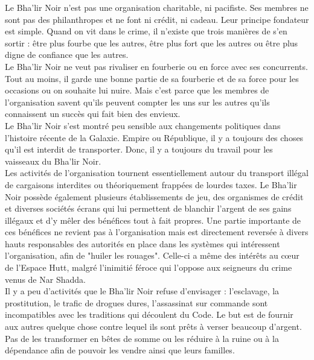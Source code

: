 \documentclass[twoside]{article}
\begin{document}
Le Bha'lir Noir n'est pas une organisation charitable, ni pacifiste. Ses membres ne sont pas des philanthropes et ne font ni crédit, ni cadeau. Leur principe fondateur est simple. Quand on vit dans le crime, il n'existe que trois manières de s'en sortir : être plus fourbe que les autres, être plus fort que les autres ou être plus digne de confiance que les autres.\\

Le Bha'lir Noir ne veut pas rivaliser en fourberie ou en force avec ses concurrents. Tout au moins, il garde une bonne partie de sa fourberie et de sa force pour les occasions ou on souhaite lui nuire. Mais c'est parce que les membres de l'organisation savent qu'ils peuvent compter les uns sur les autres qu'ils connaissent un succès qui fait bien des envieux.\\

Le Bha'lir Noir s'est montré peu sensible aux changements politiques dans l'histoire récente de la Galaxie. Empire ou République, il y a toujours des choses qu'il est interdit de transporter. Donc, il y a toujours du travail pour les vaisseaux du Bha'lir Noir.\\

Les activités de l'organisation tournent essentiellement autour du transport illégal de cargaisons interdites ou théoriquement frappées de lourdes taxes. Le Bha'lir Noir possède également plusieurs établissements de jeu, des organismes de crédit et diverses sociétés écrans qui lui permettent de blanchir l'argent de ses gains illégaux et d'y mêler des bénéfices tout à fait propres. Une partie importante de ces bénéfices ne revient pas à l'organisation mais est directement reversée à divers hauts responsables des autorités en place dans les systèmes qui intéressent l'organisation, afin de "huiler les rouages". Celle-ci a même des intérêts au cœur de l'Espace Hutt, malgré l'inimitié féroce qui l'oppose aux seigneurs du crime venus de Nar Shadda.\\

Il y a peu d'activités que le Bha'lir Noir refuse d'envisager : l'esclavage, la prostitution, le trafic de drogues dures, l'assassinat sur commande sont incompatibles avec les traditions qui découlent du Code. Le but est de fournir aux autres quelque chose contre lequel ils sont prêts à verser beaucoup d'argent. Pas de les transformer en bêtes de somme ou les réduire à la ruine ou à la dépendance afin de pouvoir les vendre ainsi que leurs familles.\\
\end{document}
